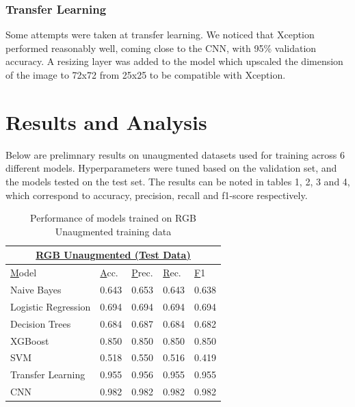 \documentclass[10pt,twocolumn,letterpaper]{article}
\begin{document}
\subsubsection{Transfer Learning}
Some attempts were taken at transfer learning. We noticed that Xception performed reasonably well, coming close to the CNN, with 95\% validation accuracy. A resizing layer was added to the model which upscaled the dimension of the image to 72x72 from 25x25 to be compatible with Xception.

\section{Results and Analysis}

Below are prelimnary results on unaugmented datasets used for training across 6 different models. Hyperparameters were tuned based on the validation set, and the models tested on the test set. The results can be noted in tables 1, 2, 3 and 4, which correspond to accuracy, precision, recall and f1-score respectively. 


\begin{table}[]
   \begin{tabular}{|lllll|}
   \hline
   \multicolumn{5}{|c|}{{\ul \textbf{RGB Unaugmented (Test Data)}}}                                                                                                  \\ \hline
   \multicolumn{1}{|l|}{{\ul Model}}   & \multicolumn{1}{l|}{{\ul Acc.}} & \multicolumn{1}{l|}{{\ul Prec.}} & \multicolumn{1}{l|}{{\ul Rec.}} & {\ul F1} \\ \hline
   \multicolumn{1}{|l|}{Naive Bayes}   & \multicolumn{1}{l|}{0.643}      & \multicolumn{1}{l|}{0.653}       & \multicolumn{1}{l|}{0.643}      & 0.638    \\ \hline
   \multicolumn{1}{|l|}{Logistic Regression}     & \multicolumn{1}{l|}{0.694}      & \multicolumn{1}{l|}{0.694}       & \multicolumn{1}{l|}{0.694}      & 0.694    \\ \hline
   \multicolumn{1}{|l|}{Decision Trees}            & \multicolumn{1}{l|}{0.684}      & \multicolumn{1}{l|}{0.687}       & \multicolumn{1}{l|}{0.684}      & 0.682    \\ \hline
   \multicolumn{1}{|l|}{XGBoost}       & \multicolumn{1}{l|}{0.850}      & \multicolumn{1}{l|}{0.850}       & \multicolumn{1}{l|}{0.850}      & 0.850    \\ \hline
   \multicolumn{1}{|l|}{SVM}           & \multicolumn{1}{l|}{0.518}      & \multicolumn{1}{l|}{0.550}       & \multicolumn{1}{l|}{0.516}      & 0.419    \\ \hline
   \multicolumn{1}{|l|}{Transfer Learning} & \multicolumn{1}{l|}{0.955}      & \multicolumn{1}{l|}{0.956}       & \multicolumn{1}{l|}{0.955}      & 0.955    \\ \hline
   \multicolumn{1}{|l|}{CNN}           & \multicolumn{1}{l|}{0.982}      & \multicolumn{1}{l|}{0.982}       & \multicolumn{1}{l|}{0.982}      & 0.982    \\ \hline
   \end{tabular}
   \caption{Performance of models trained on  RGB Unaugmented training data}
\end{table}
\end{document}
